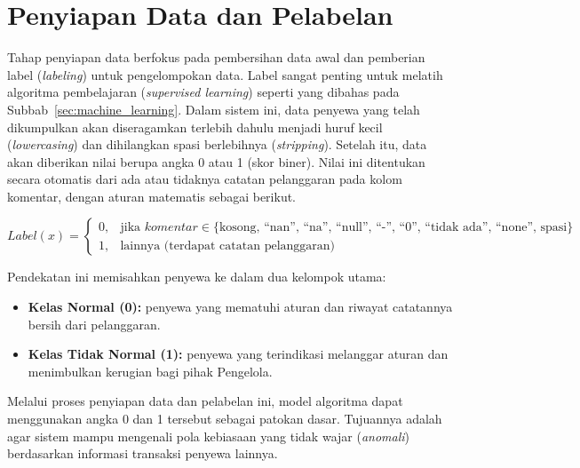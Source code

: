 \section{Penyiapan Data dan Pelabelan}

Tahap penyiapan data berfokus pada pembersihan data awal dan pemberian label (\textit{labeling}) untuk pengelompokan data. Label sangat penting untuk melatih algoritma pembelajaran (\textit{supervised learning}) seperti yang dibahas pada Subbab~\ref{sec:machine_learning}. Dalam sistem ini, data penyewa yang telah dikumpulkan akan diseragamkan terlebih dahulu menjadi huruf kecil ({\it lowercasing}) dan dihilangkan spasi berlebihnya ({\it stripping}). Setelah itu, data akan diberikan nilai berupa angka 0 atau 1 (skor biner). Nilai ini ditentukan secara otomatis dari ada atau tidaknya catatan pelanggaran pada kolom komentar, dengan aturan matematis sebagai berikut.

\[
Label(x) =
\begin{cases}
0, & \text{jika } komentar \in \{ \text{kosong, ``nan'', ``na'', ``null'', ``-'', ``0'', ``tidak ada'', ``none'', spasi} \} \\
1, & \text{lainnya (terdapat catatan pelanggaran)}
\end{cases}
\]

Pendekatan ini memisahkan penyewa ke dalam dua kelompok utama:
\begin{itemize}
    \item \textbf{Kelas Normal (0):} penyewa yang mematuhi aturan dan riwayat catatannya bersih dari pelanggaran.
    \item \textbf{Kelas Tidak Normal (1):} penyewa yang terindikasi melanggar aturan dan menimbulkan kerugian bagi pihak Pengelola.
\end{itemize}

Melalui proses penyiapan data dan pelabelan ini, model algoritma dapat menggunakan angka 0 dan 1 tersebut sebagai patokan dasar. Tujuannya adalah agar sistem mampu mengenali pola kebiasaan yang tidak wajar (\textit{anomali}) berdasarkan informasi transaksi penyewa lainnya.
